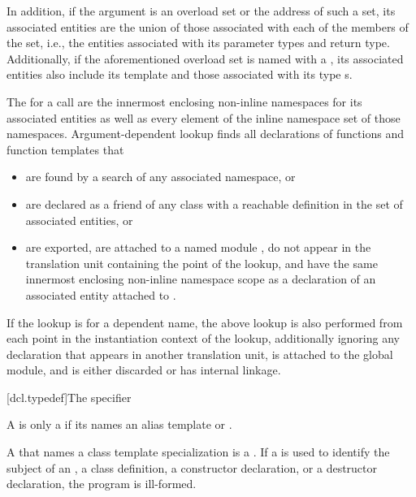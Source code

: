 \documentclass{wg21}
\begin{document}
In addition, if the argument is an overload set or the address of such a set,
its associated entities
are the union of those associated with each of the
members of the set, i.e., the entities associated with its
parameter types and return type.
Additionally, if the aforementioned overload set is named with
a , its associated entities also include
its template   and
those associated with its type s.

\pnum
The  for a call are
the innermost enclosing non-inline namespaces for its associated entities
as well as every element of the inline namespace set
of those namespaces.
Argument-dependent lookup finds
all declarations of functions and function templates that
\begin{itemize}
    \item
    are found by a search of any associated namespace, or
    \item
    are declared as a friend of any class
    with a reachable definition in the set of associated entities, or
    \item
    are exported,
    are attached to a named module ,
    do not appear in the translation unit containing the point of the lookup, and
    have the same innermost enclosing non-inline namespace scope as
    a declaration of an associated entity attached to .
\end{itemize}
If the lookup is for a dependent name,
the above lookup is also performed
from each point in the instantiation context of the lookup,
additionally ignoring any declaration that
appears in another translation unit,
is attached to the global module, and
is either discarded or has internal linkage.

[dcl.typedef]{The  specifier}%


\pnum
{}%
A  is only a 
if its  names
an alias template or .
\begin{note}
    A  that names a class template specialization
    is a .
    If a  is used to identify the subject of an
    , a class
    definition, a constructor
    declaration, or a destructor
    declaration, the program is ill-formed.
\end{note}
\end{document}

